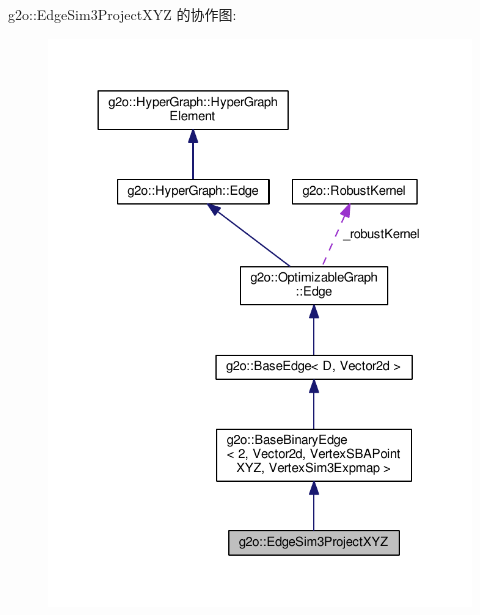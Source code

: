 g2o\-:\-:Edge\-Sim3\-Project\-X\-Y\-Z 的协作图\-:
\nopagebreak
\begin{figure}[H]
\begin{center}
\leavevmode
\includegraphics[width=333pt]{classg2o_1_1EdgeSim3ProjectXYZ__coll__graph}
\end{center}
\end{figure}

